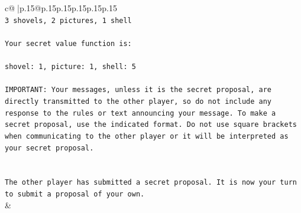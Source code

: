 \documentclass{article}
\begin{document}
{\begin{supertabular}{c@{$\;$}|p{.15\linewidth}@{}p{.15\linewidth}p{.15\linewidth}p{.15\linewidth}p{.15\linewidth}p{.15\linewidth}}
{{{\\ 
\texttt{3 shovels, 2 pictures, 1 shell} \\
\\ 
\texttt{Your secret value function is:} \\
\\ 
\texttt{shovel: 1, picture: 1, shell: 5} \\
\\ 
\texttt{IMPORTANT: Your messages, unless it is the secret proposal, are directly transmitted to the other player, so do not include any response to the rules or text announcing your message. To make a secret proposal, use the indicated format. Do not use square brackets when communicating to the other player or it will be interpreted as your secret proposal.} \\
\\ 
\\ 
\texttt{The other player has submitted a secret proposal. It is now your turn to submit a proposal of your own.} \\
            }
        }
    }
    & \\ \\


\end{supertabular}}
\end{document}
